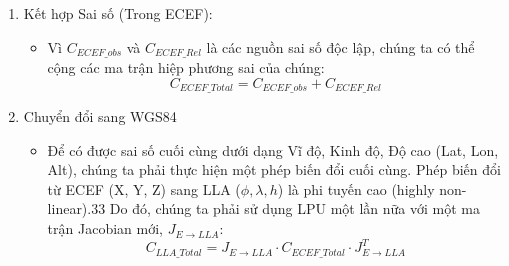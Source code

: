 \begin{enumerate}
\begin{itemize}
    \end{itemize}
    \item Kết hợp Sai số (Trong ECEF):
    \begin{itemize}
        \item Vì $C_{ECEF\_obs}$ và $C_{ECEF\_Rel}$ là các nguồn sai số độc lập, chúng ta có thể cộng các ma trận hiệp phương sai của chúng: $$C_{ECEF\_Total} = C_{ECEF\_obs} + C_{ECEF\_Rel}$$
    \end{itemize} \newpage
    \item Chuyển đổi sang WGS84 
    \begin{itemize}
        \item Để có được sai số cuối cùng dưới dạng Vĩ độ, Kinh độ, Độ cao (Lat, Lon, Alt), chúng ta phải thực hiện một phép biến đổi cuối cùng. Phép biến đổi từ ECEF (X, Y, Z) sang LLA ($\phi, \lambda, h$) là phi tuyến cao (highly non-linear).33 Do đó, chúng ta phải sử dụng LPU một lần nữa với một ma trận Jacobian mới, $J_{E \rightarrow LLA}$:
        $$C_{LLA\_Total} = J_{E \rightarrow LLA} \cdot C_{ECEF\_Total} \cdot J_{E \rightarrow LLA}^T$$
    \end{itemize}
\end{enumerate}
